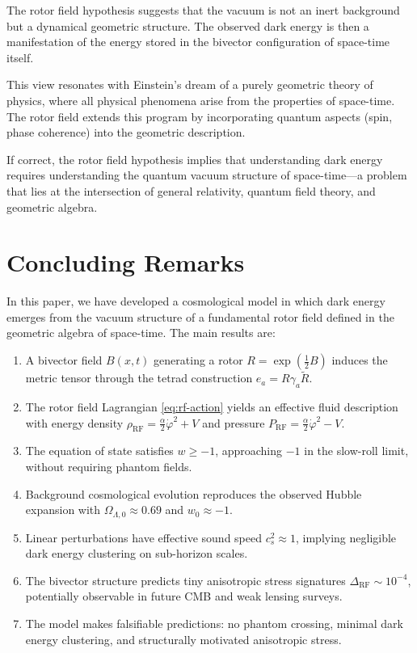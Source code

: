 \documentclass[11pt,a4paper]{article}
\numberwithin{equation}{section}
\theoremstyle{plain}
\theoremstyle{definition}
\theoremstyle{remark}
\begin{document}
The rotor field hypothesis suggests that the vacuum is not an inert background but a dynamical geometric structure. The observed dark energy is then a manifestation of the energy stored in the bivector configuration of space-time itself.

This view resonates with Einstein's dream of a purely geometric theory of physics, where all physical phenomena arise from the properties of space-time. The rotor field extends this program by incorporating quantum aspects (spin, phase coherence) into the geometric description.

If correct, the rotor field hypothesis implies that understanding dark energy requires understanding the quantum vacuum structure of space-time---a problem that lies at the intersection of general relativity, quantum field theory, and geometric algebra.

\section{Concluding Remarks}
\label{sec:conclusion}

In this paper, we have developed a cosmological model in which dark energy emerges from the vacuum structure of a fundamental rotor field defined in the geometric algebra of space-time. The main results are:

\begin{enumerate}
  \item A bivector field $B(x,t)$ generating a rotor $R = \exp(\frac{1}{2}B)$ induces the metric tensor through the tetrad construction $e_a = R\gamma_a\widetilde{R}$.
  \item The rotor field Lagrangian \eqref{eq:rf-action} yields an effective fluid description with energy density $\rho_{\mathrm{RF}} = \frac{\alpha}{2}\dot{\varphi}^2 + V$ and pressure $P_{\mathrm{RF}} = \frac{\alpha}{2}\dot{\varphi}^2 - V$.
  \item The equation of state satisfies $w \geq -1$, approaching $-1$ in the slow-roll limit, without requiring phantom fields.
  \item Background cosmological evolution reproduces the observed Hubble expansion with $\Omega_{\Lambda,0} \approx 0.69$ and $w_0 \approx -1$.
  \item Linear perturbations have effective sound speed $c_s^2 \approx 1$, implying negligible dark energy clustering on sub-horizon scales.
  \item The bivector structure predicts tiny anisotropic stress signatures $\Delta_{\mathrm{RF}} \sim 10^{-4}$, potentially observable in future CMB and weak lensing surveys.
  \item The model makes falsifiable predictions: no phantom crossing, minimal dark energy clustering, and structurally motivated anisotropic stress.
\end{enumerate}
\end{document}
